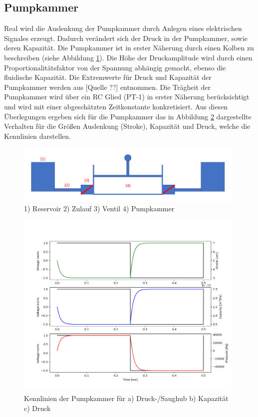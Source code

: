\documentclass[fontsize=12pt, a4paper]{scrartcl}
\begin{document}
\subsection{Pumpkammer}
Real wird die Auslenkung der Pumpkammer durch Anlegen eines elektrischen Signales erzeugt. Dadurch verändert sich der Druck in der Pumpkammer, sowie deren Kapazität. Die Pumpkammer ist in erster Näherung durch einen Kolben zu beschreiben (siehe Abbildung \ref{fig:kammerkonzept}). Die Höhe der Druckamplitude wird durch einen Proportionalitätsfaktor von der Spannung abhängig gemacht, ebenso die fluidische Kapazität. Die Extremwerte für Druck und Kapazität der Pumpkammer werden aus [Quelle ??] entnommen. Die Trägheit der Pumpkammer wird über ein RC Glied (PT-1) in erster Näherung berücksichtigt und wird mit einer abgeschätzten Zeitkonstante konkretisiert.
Aus diesen Überlegungen ergeben sich für die Pumpkammer das in Abbildung \ref{fig:kammerkennlinie} dargestellte Verhalten für die Größen Auslenkung (Stroke), Kapazität und Druck, welche die Kennlinien darstellen.

\begin{figure}[H]
	\centering
	\includegraphics[width=0.98\textwidth]{bilder/theorie/pumpe_prinzipskizze.PNG}
	\caption{1) Reservoir 2) Zulauf 3) Ventil 4) Pumpkammer}
	\label{fig:kammerkonzept}
\end{figure}

\begin{figure}[H]
	\centering
	\includegraphics[width=0.98\textwidth]{bilder/Kennlinien/Chamber_kennlinie.PNG}
	\caption{Kennlinien der Pumpkammer für a) Druck-/Saughub b) Kapazität c) Druck}
	\label{fig:kammerkennlinie}
\end{figure}
\end{document}
